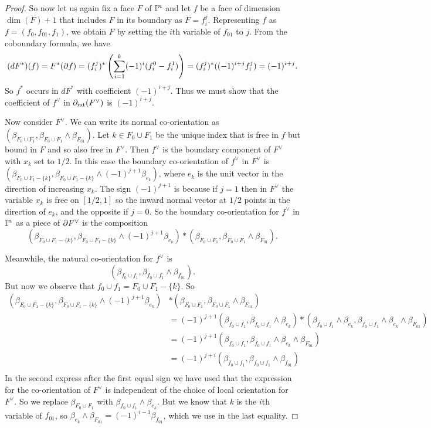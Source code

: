 \begin{proof}
So now let us again fix a face $F$ of $\mathbb{I}^n$ and let $f$ be a face of dimension $\dim(F)+1$ that includes $F$ in its boundary as $F = f_i^j$. Representing $f$ as $f = (f_0,f_{01},f_1)$, we obtain $F$ by setting the $i$th variable of $f_{01}$ to $j$. From the coboundary formula, we have
\begin{equation*}
(dF^*)(f) = F^*(\partial f) = (f_i^j)^*\left(\sum_{i = 1}^k (-1)^i(f_i^0-f^1_i)\right)
 = (f_i^j)^*((-1)^{i+j}f_i^j) = (-1)^{i+j}.
\end{equation*}
So
$f^*$ occurs in $dF^*$ with coefficient $(-1)^{i+j}$. Thus we must show that the coefficient of $f^\vee$ in $\partial_{\text{int}} (F^\vee)$ is $(-1)^{i+j}$.

Now consider $F^\vee$. We can write its normal co-orientation as $(\beta_{F_0 \cup F_1},\beta_{F_0 \cup F_1} \wedge \beta_{F_{01}})$. Let $k \in F_0 \cup F_1$ be the unique index that is free in $f$ but bound in $F$ and so also free in $F^\vee$. Then $f^\vee$ is the boundary component of $F^\vee$ with $x_k$ set to $1/2$. In this case the boundary co-orientation of $f^\vee$ in $F^\vee$ is $(\beta_{F_0 \cup F_1-\{k\}},\beta_{F_0 \cup F_1-\{k\}} \wedge (-1)^{j+1} \beta_{e_k})$, where $e_k$ is the unit vector in the direction of increasing $x_k$. The sign $(-1)^{j+1}$ is because if $j = 1$ then in $F^\vee$ the variable $x_k$ is free on $[1/2,1]$ so the inward normal vector at $1/2$ points in the direction of $e_k$, and the opposite if $j = 0$. So the boundary co-orientation for $f^\vee$ in $\mathbb{I}^n$ as a piece of $\partial F^\vee$ is the composition $$(\beta_{F_0 \cup F_1-\{k\}},\beta_{F_0 \cup F_1-\{k\}} \wedge (-1)^{j+1} \beta_{e_k})*(\beta_{F_0 \cup F_1},\beta_{F_0 \cup F_1} \wedge \beta_{F_{01}}).$$

Meanwhile, the natural co-orientation for $f^\vee$ is $$(\beta_{f_0 \cup f_1},\beta_{f_0 \cup f_1} \wedge \beta_{f_{01}}).$$ But now we observe that $f_0 \cup f_1 = F_0 \cup F_1-\{k\}$. So
\begin{align*}
(\beta_{F_0 \cup F_1-\{k\}},\beta_{F_0 \cup F_1-\{k\}} \wedge (-1)^{j+1} \beta_{e_k})&*(\beta_{F_0 \cup F_1},\beta_{F_0 \cup F_1} \wedge \beta_{F_{01}})\\
& = (-1)^{j+1}(\beta_{f_0 \cup f_1},\beta_{f_0 \cup f_1} \wedge \beta_{e_k})*(\beta_{f_0 \cup f_1} \wedge \beta_{e_k},\beta_{f_0 \cup f_1} \wedge \beta_{e_k} \wedge \beta_{F_{01}})\\
& = (-1)^{j+1}(\beta_{f_0 \cup f_1},\beta_{f_0 \cup f_1} \wedge \beta_{e_k} \wedge \beta_{F_{01}})\\
& = (-1)^{j+i}(\beta_{f_0 \cup f_1},\beta_{f_0 \cup f_1} \wedge \beta_{f_{01}})\\
\end{align*}
In the second express after the first equal sign we have used that the expression for the co-orientation of $F^\vee$ is independent of the choice of local orientation for $F^\vee$. So we replace $\beta_{F_0 \cup F_1}$ with $\beta_{f_0 \cup f_1} \wedge \beta_{e_k}$. But we know that $k$ is the $i$th variable of $f_{01}$, so
$\beta_{e_k} \wedge \beta_{F_{01}} = (-1)^{i-1}\beta_{f_{01}}$, which we use in the last equality.
\end{proof}


